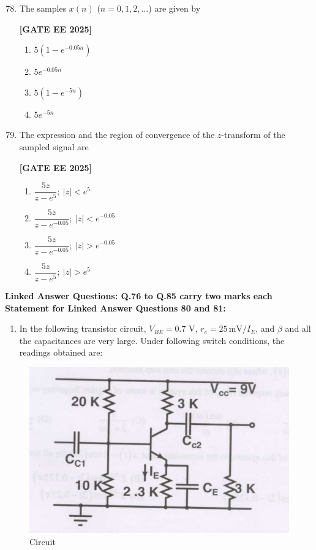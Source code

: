 \documentclass[12pt]{article}
\begin{document}
\begin{enumerate}[leftmargin=*, label=\textbf{Q.\arabic*:}]
\setcounter{enumi}{77}

\item The samples $x(n)$ ($n=0,1,2,\ldots$) are given by
 
\noindent \textbf{[GATE EE 2025]}
\begin{multicols}{4}
\begin{enumerate}
  \item $5 \left( 1 - e^{-0.05 n} \right)$
  \item $5 e^{-0.05 n}$
  \item $5 \left( 1 - e^{-5 n} \right)$
  \item $5 e^{-5 n}$
\end{enumerate}
\end{multicols}

\item The expression and the region of convergence of the $z$-transform of the sampled signal are
 
\noindent \textbf{[GATE EE 2025]}
\begin{multicols}{2}
\begin{enumerate}
  \item $\dfrac{5z}{z-e^{5}};~ |z|<e^{5}$
  \item $\dfrac{5z}{z-e^{-0.05}};~ |z|<e^{-0.05}$
  \item $\dfrac{5z}{z-e^{-0.05}};~ |z|>e^{-0.05}$
  \item $\dfrac{5z}{z-e^{5}};~ |z|>e^{5}$
\end{enumerate}
\end{multicols}

\end{enumerate}


 \large \textbf {Linked Answer Questions: Q.76 to Q.85 carry two marks each}
 \large \textbf {Statement for Linked Answer Questions 80 and 81: }

\begin{enumerate}
\item In the following transistor circuit, $V_{BE}=0.7$ V, $r_e = 25\,\text{mV}/I_E$, and $\beta$ and all the capacitances are very large. Under following switch conditions, the readings obtained are:
\end{enumerate}
\begin{figure}[H]\centering
\includegraphics[width=0.6\columnwidth]{figs/q8081.png}
\caption{Circuit}
\label{fig:q8081}
\end{figure}
\end{document}
